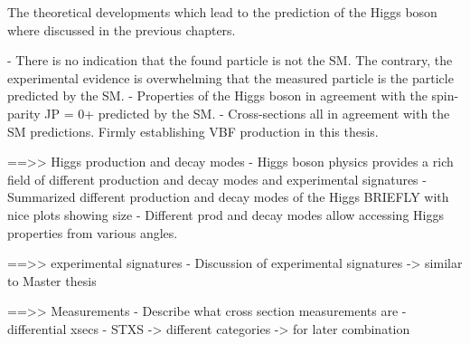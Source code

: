 

The theoretical developments which lead to the prediction of the Higgs boson where discussed in the previous chapters.

- There is no indication that the found particle is not the SM. The contrary, the experimental evidence is overwhelming that the measured particle is the particle predicted by the SM.
- Properties of the Higgs boson in agreement with the spin-parity JP = 0+ predicted by the SM. 
- Cross-sections all in agreement with the SM predictions. Firmly establishing VBF production in this thesis.

==>> Higgs production and decay modes
- Higgs boson physics provides a rich field of different production and decay modes and experimental signatures
- Summarized different production and decay modes of the Higgs BRIEFLY with nice plots showing size
- Different prod and decay modes allow accessing Higgs properties from various angles.

==>> experimental signatures
- Discussion of experimental signatures
  -> similar to Master thesis

==>> Measurements
- Describe what cross section measurements are 
- differential xsecs
- STXS -> different categories -> for later combination

